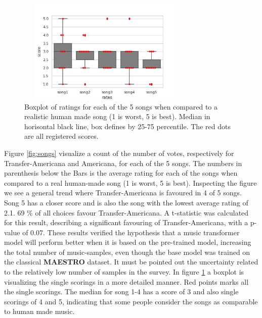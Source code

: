 \documentclass{IEEEtran}
\begin{document}
        \begin{figure}
            \centering
            \includegraphics[width=8.5cm, height=5cm]{scores.png}
            \caption{Boxplot of ratings for each of the 5 songs when compared to a realistic human made song (1 is worst, 5 is best). Median in horisontal black line, box defines by 25-75 percentile. The red dots are all registered scores.}
             \label{fig:scores}
        \end{figure} 

        Figure \ref{fig:songs} visualize a count of the number of votes, respectively for Transfer-Americana
        and Americana, for each of the 5 songs. The numbers in parenthesis below the Bars is the average rating for each of the songs when compared to a real human-made song (1 is worst, 5 is best). Inspecting the figure we see a general trend where Transfer-Americana is favoured in 4 of 5 songs. Song 5 has a closer score and is also the song with the lowest average rating of 2.1. 69 \% of all choices favour Transfer-Americana. A t-statistic was calculated for this result, describing a significant favouring of 
        Transfer-Americana, with a p-value of 0.07. These results verified the hypothesis that a music transformer model will perform better when it is based on the pre-trained model, increasing the total number of music-samples, even though the base model was trained on the classical \textbf{MAESTRO} dataset. It must be pointed out the uncertainty related to the relatively low number of samples in the survey. 
        In figure \ref{fig:scores} a boxplot is visualizing the single scorings in a more detailed manner. Red points marks all the single scorings. The median for song 1-4 has a score of 3 and also single scorings of 4 and 5, indicating that some people consider the songs as comparable to human made music.
        
\end{document}
